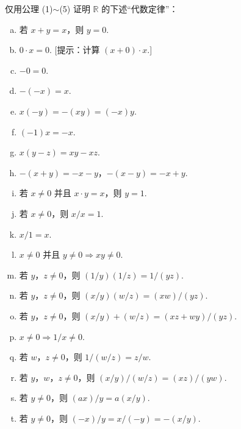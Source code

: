 \documentclass[../../main.tex]{subfiles}
\begin{document}
\begin{exercise}\label{exercise:ch01-整数与实数-1}
仅用公理 (1)$\sim$(5) 证明 $\mathbb{R}$ 的下述“代数定律”：
\begin{enumerate}[(a)]
\item 若 $x + y = x$，则 $y = 0$.
\item $0 \cdot x = 0$. [提示：计算 $(x + 0) \cdot x$.]
\item $-0 = 0$.
\item $-(-x) = x$.
\item $x(-y) = -(xy) = (-x)y$.
\item $(-1)x = -x$.
\item $x(y - z) = xy - xz$.
\item $-(x + y) = -x - y$，$-(x - y) = -x + y$.
\item 若 $x \neq 0$ 并且 $x \cdot y = x$，则 $y = 1$.
\item 若 $x \neq 0$，则 $x/x = 1$.
\item $x/1 = x$.
\item $x \neq 0$ 并且 $y \neq 0 \Longrightarrow xy \neq 0$.
\item 若 $y$，$z \neq 0$，则 $(1/y)(1/z) = 1/(yz)$.
\item 若 $y$，$z \neq 0$，则 $(x/y)(w/z) = (xw)/(yz)$.
\item 若 $y$，$z \neq 0$，则 $(x/y) + (w/z) = (xz + wy)/(yz)$.
\item $x \neq 0 \Longrightarrow 1/x \neq 0$.
\item 若 $w$，$z \neq 0$，则 $1/(w/z) = z/w$.
\item 若 $y$，$w$，$z \neq 0$，则 $(x/y)/(w/z) = (xz)/(yw)$.
\item 若 $y \neq 0$，则 $(ax)/y = a(x/y)$.
\item 若 $y \neq 0$，则 $(-x)/y = x/(-y) = -(x/y)$.
\end{enumerate}
\end{exercise}
\end{document}
